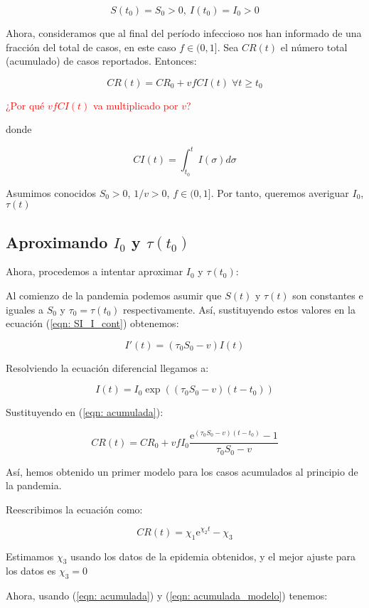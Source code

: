 $$S(t_0)=S_0>0, \: I(t_0)=I_0>0$$

Ahora, consideramos que al final del período infeccioso nos han informado de una fracción del total de casos, en este caso $f\in (0,1]$. Sea $CR(t)$ el número total (acumulado) de casos reportados. Entonces:

\begin{equation}
\label{eqn: acumulada}
CR(t) = CR_0 + vfCI(t) \; \forall t \geq t_0
\end{equation}

\textcolor{red}{¿Por qué $vfCI(t)$ va multiplicado por $v$?}

donde

$$CI(t) = \int_{t_0}^t I(\sigma ) d\sigma $$

Asumimos conocidos $S_0 > 0$, $1/v>0$, $f\in (0,1]$. Por tanto, queremos averiguar $I_0$, $\tau (t)$

\subsection{Aproximando $I_0$ y $\tau (t_0)$}
Ahora, procedemos a intentar aproximar $I_0$ y $\tau (t_0)$:

Al comienzo de la pandemia podemos asumir que $S(t)$ y $\tau (t)$ son constantes e iguales a $S_0$ y $\tau_0 = \tau (t_0)$ respectivamente. Así, sustituyendo estos valores en la ecuación (\ref{eqn: SI_I_cont}) obtenemos:

$$I'(t) = (\tau_0 S_0 -v) I(t)$$

Resolviendo la ecuación diferencial llegamos a:

$$I(t) = I_0\exp{((\tau_0 S_0-v)(t-t_0))}$$

Sustituyendo en (\ref{eqn: acumulada}):

$$CR(t) = CR_0 + vfI_0\frac{\mathrm{e}^{(\tau_0 S_0 -v)(t-t_0)} -1}{\tau_0 S_0-v}$$

Así, hemos obtenido un primer modelo para los casos acumulados al principio de la pandemia.

Reescribimos la ecuación como:

\begin{equation}
\label{eqn: acumulada_modelo}
CR(t) = \chi_1 \mathrm{e}^{\chi_2 t} -\chi_3
\end{equation}

Estimamos $\chi_3$ usando los datos de la epidemia obtenidos, y el mejor ajuste para los datos es $\chi_3=0$

Ahora, usando (\ref{eqn: acumulada}) y (\ref{eqn: acumulada_modelo}) tenemos:

